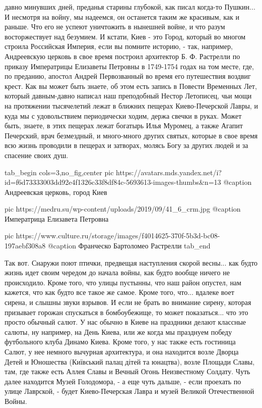 давно минувших дней, преданья старины глубокой, как писал когда-то Пушкин... И
несмотря на войну, мы надеемся, он останется таким же красивым, как и раньше.
Что его не успеют уничтожить в нынешней войне, и что разум восторжествует над
безумием.  И кстати, Киев - это Город, который во многом строила Российская
Империя, если вы помните историю, - так, например, Андреевскую церковь в свое
время построил архитектор Б. Ф.  Растрелли по приказу Императрицы Елизаветы
Петровны в 1749-1754 годах на том месте, где, по преданию, апостол Андрей
Первозванный во время его путешествия воздвиг крест. Как вы может быть знаете,
об этом есть запись в Повести Временных Лет, который давным-давно написал наш
преподобный Нестор Летописец, чьи мощи на протяжении тысячелетий лежат в
ближних пещерах Киево-Печерской Лавры, и куда мы с удовольствием периодически
ходим, держа свечки в руках.  Может быть, знаете, в этих пещерах лежат богатырь
Илья Муромец, а также Агапит Печерский, врач безмездный, и много-много других
святых, которые в свое время всю жизнь проводили в пещерах и затворах, молясь
Богу за других людей и за спасение своих душ.

\ifcmt
  tab_begin cols=3,no_fig,center
     pic https://avatars.mds.yandex.net/i?id=f6d73333003dd92e4f1326c33f8df84c-5693613-images-thumbs&n=13
		 @caption Андреевская церковь, город Киев

		 pic https://medru.su/wp-content/uploads/2019/09/41_6_crm.jpg
		 @caption Императрица Елизавета Петровна

		 pic https://www.culture.ru/storage/images/f4014625-370f-5b3d-bc08-197aebf308a8
		 @caption Франческо Бартоломео Растрелли
  tab_end
\fi

Так вот. Снаружи поют птички, предвещая наступления скорой весны... как будто
жизнь идет своим чередом до начала войны, как будто вообще ничего не
происходило. Кроме того, что улицы пустынны, что наш район опустел, нам
кажется, что как будто все такое же самое. Кроме того, что... вдалеке воет
сирена, и слышны звуки взрывов.  И если не брать во внимание сирену, которая
призывает горожан спускаться в бомбоубежище, то может показаться... что это
просто обычный салют. У нас обычно в Киеве на праздники делают классные салюты,
ну например, на День Киева, или же когда мы празднуем победу футбольного клуба
Динамо Киева. Кроме того, у нас также есть гостиница Салют, у нее немного
вычурная архитектура, и она находится возле Дворца Детей и Юношества (Київський
палац дітей та юнацтва), возле Площади Славы, там, где также есть Аллея Славы и
Вечный Огонь Неизвестному Солдату. Чуть далее находится Музей Голодомора, - а
еще чуть дальше, - если проехать по улице Лаврской, - будет Киево-Печерская
Лавра и музей Великой Отечественной Войны.

